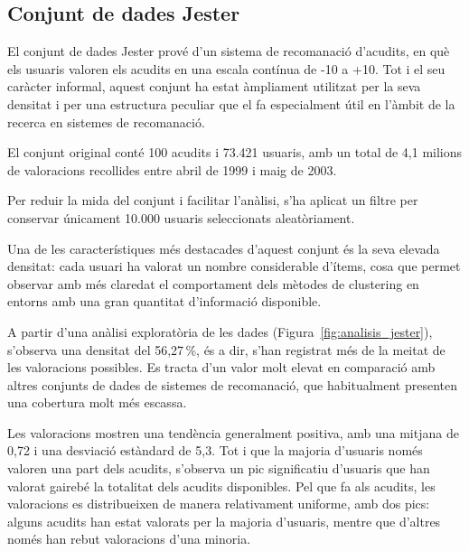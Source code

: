 \documentclass[a4paper,12pt]{report}
\begin{document}
\subsection{Conjunt de dades Jester}

El conjunt de dades Jester \cite{jesterdataset,goldberg2001eigentaste} prové d’un sistema de recomanació d’acudits, en què els usuaris valoren els acudits en una escala contínua de -10 a +10. Tot i el seu caràcter informal, aquest conjunt ha estat àmpliament utilitzat per la seva densitat i per una estructura peculiar que el fa especialment útil en l’àmbit de la recerca en sistemes de recomanació.

El conjunt original conté 100 acudits i 73.421 usuaris, amb un total de 4,1 milions de valoracions recollides entre abril de 1999 i maig de 2003.

Per reduir la mida del conjunt i facilitar l’anàlisi, s’ha aplicat un filtre per conservar únicament 10.000 usuaris seleccionats aleatòriament.

Una de les característiques més destacades d’aquest conjunt és la seva elevada densitat: cada usuari ha valorat un nombre considerable d’ítems, cosa que permet observar amb més claredat el comportament dels mètodes de clustering en entorns amb una gran quantitat d’informació disponible.

A partir d’una anàlisi exploratòria de les dades (Figura~\ref{fig:analisis_jester}), s’observa una densitat del 56,27\,\%, és a dir, s’han registrat més de la meitat de les valoracions possibles. Es tracta d’un valor molt elevat en comparació amb altres conjunts de dades de sistemes de recomanació, que habitualment presenten una cobertura molt més escassa.

Les valoracions mostren una tendència generalment positiva, amb una mitjana de 0,72 i una desviació estàndard de 5,3. Tot i que la majoria d’usuaris només valoren una part dels acudits, s’observa un pic significatiu d’usuaris que han valorat gairebé la totalitat dels acudits disponibles. Pel que fa als acudits, les valoracions es distribueixen de manera relativament uniforme, amb dos pics: alguns acudits han estat valorats per la majoria d’usuaris, mentre que d’altres només han rebut valoracions d’una minoria.
\end{document}
